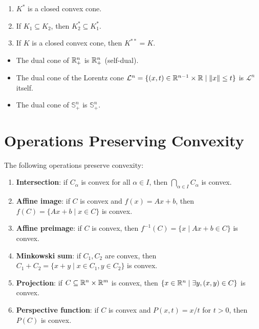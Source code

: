 \begin{proposition}
\label{prop:dual_cone}
\begin{enumerate}
    \item $K^*$ is a closed convex cone.
    \item If $K_1 \subseteq K_2$, then $K_2^* \subseteq K_1^*$.
    \item If $K$ is a closed convex cone, then $K^{**} = K$.
\end{enumerate}
\end{proposition}

\begin{example}
\begin{itemize}
    \item The dual cone of $\mathbb{R}^n_+$ is $\mathbb{R}^n_+$ (self-dual).
    \item The dual cone of the Lorentz cone
    $\mathcal{L}^n = \{(x,t) \in \mathbb{R}^{n-1} \times \mathbb{R} \mid \left\| x \right\| \leq t\}$
    is $\mathcal{L}^n$ itself.
    \item The dual cone of $\mathbb{S}^n_+$ is $\mathbb{S}^n_+$.
\end{itemize}
\end{example}

\section{Operations Preserving Convexity}

\begin{theorem}
\label{thm:operations}
The following operations preserve convexity:
\begin{enumerate}
    \item \textbf{Intersection}: if $C_\alpha$ is convex for all $\alpha \in I$,
          then $\bigcap_{\alpha \in I} C_\alpha$ is convex.
    \item \textbf{Affine image}: if $C$ is convex and $f(x) = Ax + b$, then
          $f(C) = \{Ax + b \mid x \in C\}$ is convex.
    \item \textbf{Affine preimage}: if $C$ is convex, then
          $f^{-1}(C) = \{x \mid Ax + b \in C\}$ is convex.
    \item \textbf{Minkowski sum}: if $C_1, C_2$ are convex, then
          $C_1 + C_2 = \{x + y \mid x \in C_1, y \in C_2\}$ is convex.
    \item \textbf{Projection}: if $C \subseteq \mathbb{R}^n \times \mathbb{R}^m$ is convex, then
          $\{x \in \mathbb{R}^n \mid \exists y, (x,y) \in C\}$ is convex.
    \item \textbf{Perspective function}: if $C$ is convex and $P(x,t) = x/t$ for
          $t > 0$, then $P(C)$ is convex.
\end{enumerate}
\end{theorem}

